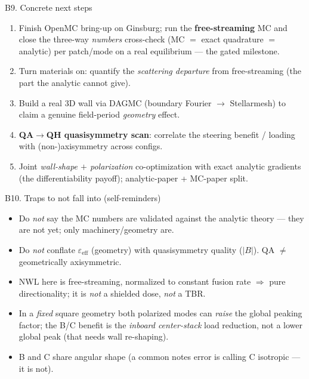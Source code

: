 \documentclass[aspectratio=169]{beamer}
\newcommand{\eps}{\varepsilon}
\begin{document}
\begin{frame}{B9. Concrete next steps}
  \small
  \begin{enumerate}
    \item Finish OpenMC bring-up on Ginsburg; run the \textbf{free-streaming} MC and close the
      three-way \emph{numbers} cross-check (MC $=$ exact quadrature $=$ analytic) per patch/mode on a
      real equilibrium --- the gated milestone.
    \item Turn materials on: quantify the \emph{scattering departure} from free-streaming (the part
      the analytic cannot give).
    \item Build a real 3D wall via DAGMC (boundary Fourier $\to$ Stellarmesh) to claim a genuine
      field-period \emph{geometry} effect.
    \item \textbf{QA$\to$QH quasisymmetry scan}: correlate the steering benefit / loading with
      (non-)axisymmetry across configs.
    \item Joint \emph{wall-shape $+$ polarization} co-optimization with exact analytic gradients
      (the differentiability payoff); analytic-paper + MC-paper split.
  \end{enumerate}
\end{frame}

\begin{frame}{B10. Traps to not fall into (self-reminders)}
  \small
  \begin{itemize}
    \item Do \emph{not} say the MC numbers are validated against the analytic theory --- they are not
      yet; only machinery/geometry are.
    \item Do \emph{not} conflate $\eps_{\mathrm{eff}}$ (geometry) with quasisymmetry quality ($|B|$).
      QA $\ne$ geometrically axisymmetric.
    \item NWL here is free-streaming, normalized to constant fusion rate $\Rightarrow$ pure
      directionality; it is \emph{not} a shielded dose, \emph{not} a TBR.
    \item In a \emph{fixed} square geometry both polarized modes can \emph{raise} the global peaking
      factor; the B/C benefit is the \emph{inboard center-stack} load reduction, not a lower global
      peak (that needs wall re-shaping).
    \item B and C share angular shape (a common notes error is calling C isotropic --- it is not).
  \end{itemize}
\end{frame}
\end{document}
